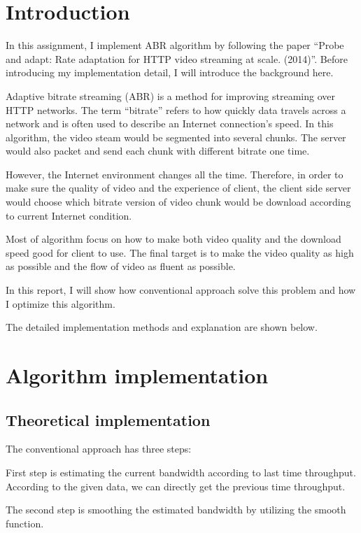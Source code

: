 \newpage
\section{Introduction}

In this assignment, I implement ABR algorithm by following the paper “Probe and adapt: Rate adaptation for HTTP video streaming at scale. (2014)”. Before introducing my implementation detail, I will introduce the background here.

Adaptive bitrate streaming (ABR) is a method for improving streaming over HTTP networks. The term “bitrate” refers to how quickly data travels across a network and is often used to describe an Internet connection’s speed. In this algorithm, the video steam would be segmented into several chunks. The server would also packet and send each chunk with different bitrate one time. 

However, the Internet environment changes all the time. Therefore, in order to make sure the quality of video and the experience of client, the client side server would choose which bitrate version of video chunk would be download according to current Internet condition.

Most of algorithm focus on how to make both video quality and the download speed good for client to use. The final target is to make the video quality as high as possible and the flow of video as fluent as possible.

In this report, I will show how conventional approach solve this problem and how I optimize this algorithm.

The detailed implementation methods and explanation are shown below.
\section{Algorithm implementation}

\subsection{Theoretical implementation}

The conventional approach has three steps:

First step is estimating the current bandwidth according to last time throughput. According to the given data, we can directly get the previous time throughput. 

The second step is smoothing the estimated bandwidth by utilizing the smooth function.


